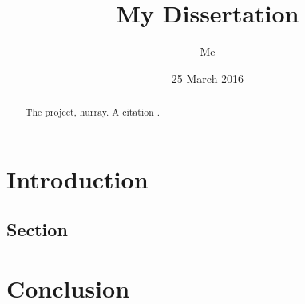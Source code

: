 \documentclass{l4proj}
\begin{document}
\title{My Dissertation}
\author{Me}
\date{25 March 2016}
\maketitle


\begin{abstract}

The project, hurray. A citation \cite{Stellman}.

\end{abstract}
\educationalconsent
\tableofcontents

\chapter{Introduction}
\label{intro}

\section{Section}

\chapter{Conclusion}
\label{conclusion}



\end{document}
